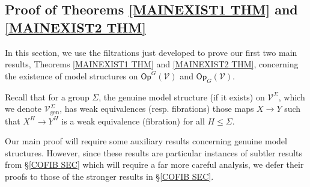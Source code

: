 \documentclass[a4paper,10pt]{article}%
\begin{document}


\subsection{Proof of Theorems \ref{MAINEXIST1 THM} and \ref{MAINEXIST2 THM}}
\label{MAINEXIST SEC}

In this section, we use the filtrations just developed to prove our first two main results,
Theorems \ref{MAINEXIST1 THM} and \ref{MAINEXIST2 THM},
concerning the existence of model structures on 
$\mathsf{Op}^G(\mathcal{V})$
and
$\mathsf{Op}_G(\mathcal{V})$.

Recall that for a group $\Sigma$, the genuine model structure (if it exists)
on $\mathcal{V}^{\Sigma}$,
which we denote $\mathcal{V}^{\Sigma}_{\text{gen}}$,
has weak equivalences (resp. fibrations)
those maps $X \to Y$ such that 
$X^H \to Y^H$ is a weak equivalence (fibration)
for all $H \leq \Sigma$.

Our main proof will require some auxiliary results concerning genuine model structures.
However, since these results are particular instances of subtler results from \S \ref{COFIB SEC}
which will require a far more careful analysis,
we defer their %
proofs to those
of the stronger results in \S \ref{COFIB SEC}.
\end{document}
